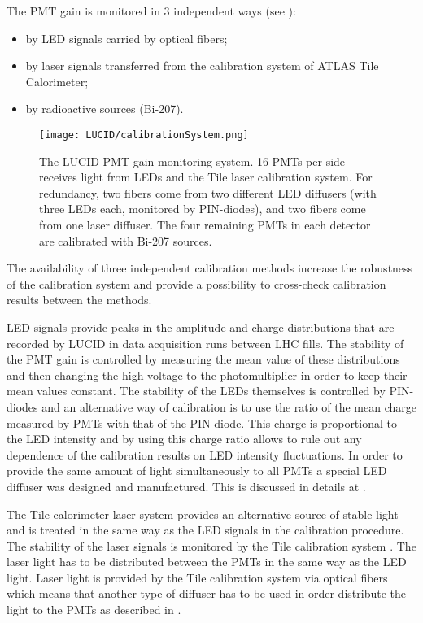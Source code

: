 The PMT gain is monitored in 3 independent ways (see ):
\begin{itemize}
 \item by LED signals carried by optical fibers;
 \item by laser signals transferred from the calibration system of ATLAS Tile Calorimeter;
 \item by radioactive sources (Bi-207).
\end{itemize}

\begin{figure}
\centering
\texttt{[image: LUCID/calibrationSystem.png]}
\caption{The LUCID PMT gain monitoring system. 16 PMTs per side receives light from LEDs and the Tile laser calibration 
system. 
For redundancy, two fibers come from two different LED diffusers (with three LEDs each, monitored by 
PIN-diodes), and two fibers come from one laser diffuser. The four remaining PMTs in each detector are calibrated 
with Bi-207 sources.}
\label{fig:calibrationSystem}
\end{figure}

The availability of three independent calibration methods increase the robustness of the calibration system 
and provide a possibility to cross-check calibration results between the methods.

LED signals provide peaks in the amplitude and charge distributions that are recorded by LUCID in data acquisition runs between LHC fills.
The stability of the PMT gain is controlled by measuring the mean value of these distributions 
and then changing the high voltage to the photomultiplier in order to keep their mean values constant. 
The stability of the LEDs themselves is controlled by PIN-diodes and an alternative way of calibration is 
to use the ratio of the mean charge measured by PMTs with that of the PIN-diode. 
This charge is proportional to the LED intensity and by using this charge ratio allows to rule out any 
dependence of the calibration results on LED intensity fluctuations.
In order to provide the same amount of light simultaneously to all PMTs a special LED diffuser was designed and manufactured.
This is discussed in details at .

The Tile calorimeter laser system provides an alternative source of stable light and is treated in the same way
as the LED signals in the calibration procedure. 
The stability of the laser signals is monitored by the Tile calibration system \cite{Aad:2008zzm}.
The laser light has to be distributed between the PMTs in the same way as the LED light.
Laser light is provided by the Tile calibration system via optical fibers which means that another type of diffuser
has to be used in order distribute the light to the PMTs as described in .

